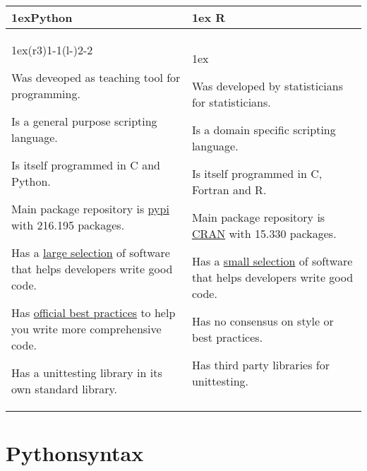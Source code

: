 \documentclass{article}
\begin{document}
\begin{table}[h]
    \begin{tabularx}{\linewidth}{>{\parskip1ex}X@{\kern4\tabcolsep}>{\parskip1ex}X}
        \toprule
        \hfil\bfseries Python
         &
        \hfil\bfseries R
        \\\cmidrule(r{3\tabcolsep}){1-1}\cmidrule(l{-\tabcolsep}){2-2}

        Was deveoped as teaching tool for programming.

        Is a general purpose scripting language.

        Is itself programmed in C and Python.

        Main package repository is \href{https://pypi.org/}{pypi} with 216.195 packages.

        Has a \href{https://github.com/mre/awesome-static-analysis\#python}{large selection}
        of software that helps developers write good code.

        Has \href{https://www.python.org/dev/peps/pep-0008/}{official best practices}
        to help you write more comprehensive code.

        Has a unittesting library in its own standard library.

         &

        Was developed by statisticians for statisticians.

        Is a domain specific scripting language.

        Is itself programmed in C, Fortran and R.

        Main package repository is \href{https://cran.r-project.org/}{CRAN} with 15.330 packages.

        Has a \href{https://github.com/mre/awesome-static-analysis\#r}{small selection}
        of software that helps developers write good code.

        Has no consensus on style or best practices.

        Has third party libraries for unittesting.

        \\\bottomrule
    \end{tabularx}
\end{table}



\section{Pythonsyntax}
\end{document}
